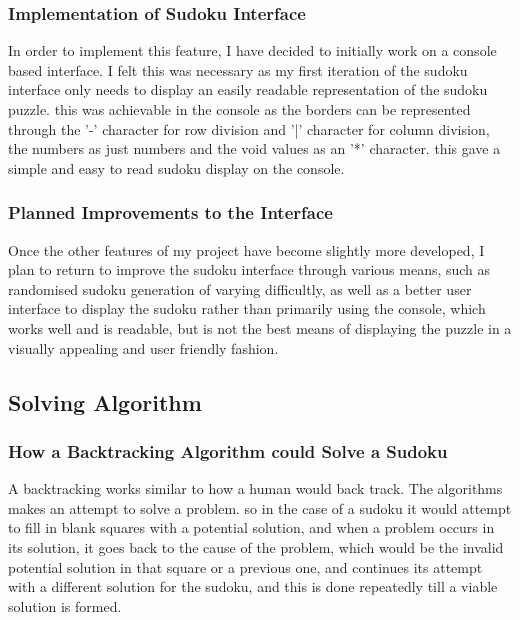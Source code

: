 \documentclass[]{final_report}
\begin{document}
\subsubsection{Implementation of Sudoku Interface}

In order to implement this feature, I have decided to initially work on a console based interface. I felt this was necessary as my first iteration of the sudoku interface only needs to display an easily readable representation of the sudoku puzzle. this was achievable in the console as the borders can be represented through the '-' character for row division and '|' character for column division, the numbers as just numbers and the void values as an '*' character. this gave a simple and easy to read sudoku display on the console. 

\subsubsection{Planned Improvements to the Interface} 

Once the other features of my project have become slightly more developed, I plan to return to improve the sudoku interface through various means, such as randomised sudoku generation of varying difficultly, as well as a better user interface to display the sudoku rather than primarily using the console, which works well and is readable, but is not the best means of displaying the puzzle in a visually appealing and user friendly fashion. 

\subsection*{Solving Algorithm} 

\subsubsection{How a Backtracking Algorithm could Solve a Sudoku} 

A backtracking works similar to how a human would back track. The algorithms makes an attempt to solve a problem. so in the case of a sudoku it would attempt to fill in blank squares with a potential solution, and when a problem occurs in its solution, it goes back to the cause of the problem, which would be the invalid potential solution in that square or a previous one, and continues its attempt with a different solution for the sudoku, and this is done repeatedly till a viable solution is formed.  
\end{document}
